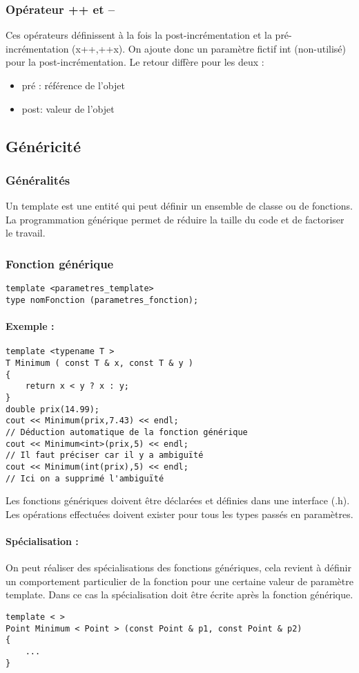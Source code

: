 \documentclass[10pt,a4paper,twoside]{article}
\begin{document}
\subsubsection{Opérateur ++ et --}
Ces opérateurs définissent à la fois la post-incrémentation et la pré-incrémentation (x++,++x). On ajoute donc un paramètre fictif int (non-utilisé) pour la post-incrémentation. Le retour diffère pour les deux :
\begin{itemize}
\item pré : référence de l'objet
\item post: valeur de l'objet
\end{itemize}

\subsection{Généricité}
\subsubsection{Généralités}
Un template est une entité qui peut définir un ensemble de classe ou de fonctions. La programmation générique permet de réduire la taille du code et de factoriser le travail.

\subsubsection{Fonction générique}

\begin{verbatim}
template <parametres_template>
type nomFonction (parametres_fonction);
\end{verbatim}

\paragraph{Exemple :}
\begin{verbatim}
template <typename T >
T Minimum ( const T & x, const T & y )
{
	return x < y ? x : y;
}
double prix(14.99);
cout << Minimum(prix,7.43) << endl;
// Déduction automatique de la fonction générique
cout << Minimum<int>(prix,5) << endl;
// Il faut préciser car il y a ambiguïté
cout << Minimum(int(prix),5) << endl;
// Ici on a supprimé l'ambiguïté
\end{verbatim}
Les fonctions génériques doivent être déclarées et définies dans une interface (.h). Les opérations effectuées doivent exister pour tous les types passés en paramètres.
\paragraph{Spécialisation :} On peut réaliser des spécialisations des fonctions génériques, cela revient à définir un comportement particulier de la fonction pour une certaine valeur de paramètre template. Dans ce cas la spécialisation doit être écrite après la fonction générique.
\begin{verbatim}
template < >
Point Minimum < Point > (const Point & p1, const Point & p2)
{
	...
}
\end{verbatim}
\end{document}

